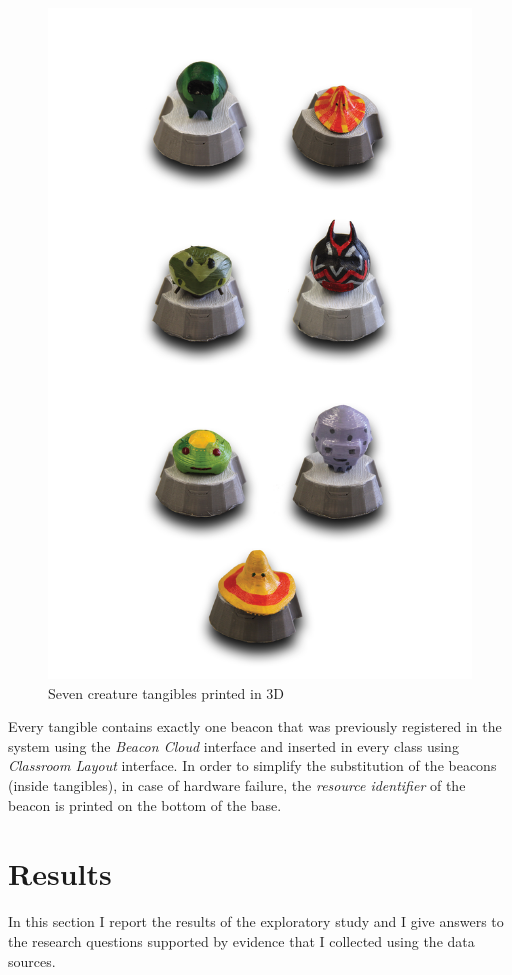 \begin{figure}
\centering
\includegraphics[width=5in]{images/tangibles.png}
\caption{Seven creature tangibles printed in 3D}
\label{fig:tangibles}
\end{figure}

Every tangible contains exactly one beacon that was previously registered in the system using the \textit{Beacon Cloud} interface and inserted in every class using \textit{Classroom Layout} interface. In order to simplify the substitution of the beacons (inside tangibles), in case of hardware failure, the \textit{resource identifier} of the beacon is  printed on the bottom of the base.

\section{Results}
In this section I report the results of the exploratory study and I give answers to the research questions supported by evidence that I collected using the data sources.

